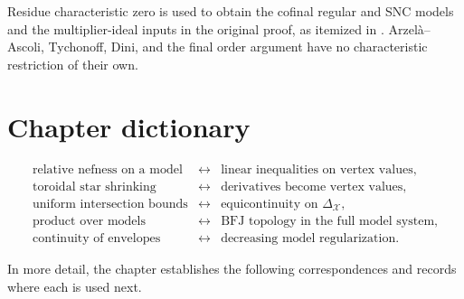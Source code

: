 Residue characteristic zero is used to obtain the cofinal regular and SNC
models and the multiplier-ideal inputs in the original proof, as itemized in
.  Arzel\`a--Ascoli, Tychonoff, Dini, and the final
order argument have no characteristic restriction of their own.

\section{Chapter dictionary}
\label{sec:ch22-dictionary}

\[
\begin{array}{ccl}
\text{relative nefness on a model}
 &\longleftrightarrow&
 \text{linear inequalities on vertex values},\\[1mm]
\text{toroidal star shrinking}
 &\longleftrightarrow&
 \text{derivatives become vertex values},\\[1mm]
\text{uniform intersection bounds}
 &\longleftrightarrow&
 \text{equicontinuity on }\Delta_{\mathcal X},\\[1mm]
\text{product over models}
 &\longleftrightarrow&
 \text{BFJ topology in the full model system},\\[1mm]
\text{continuity of envelopes}
 &\longleftrightarrow&
 \text{decreasing model regularization}.
\end{array}
\]

In more detail, the chapter establishes the following correspondences and
records where each is used next.


